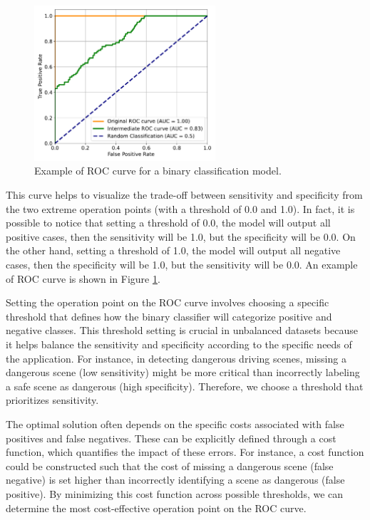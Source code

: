 \begin{figure}
    \centering
    \includegraphics[width=0.6\textwidth]{images/roc/roc_curve.pdf}
    \caption
    {Example of ROC curve for a binary classification model.}
    \label{fig:roc_curve}
\end{figure}
This curve helps to 
visualize the trade-off between sensitivity and specificity from the two extreme 
operation points (with a threshold of 0.0 and 1.0).
In fact, it is possible to notice that setting a threshold of 0.0, the model 
will output all positive cases, then the sensitivity will be 1.0, but the 
specificity will be 0.0. On the other hand, setting a threshold of 1.0, the model 
will output all negative cases, then the specificity will be 1.0, but the 
sensitivity will be 0.0. An example of ROC curve is shown in Figure 
\ref{fig:roc_curve}.

Setting the operation point on the ROC curve involves choosing a specific 
threshold that defines how the binary classifier will categorize positive and 
negative classes. This threshold setting is crucial in unbalanced datasets 
because it helps balance the sensitivity and specificity according to the 
specific needs of the application. For instance, in detecting dangerous driving 
scenes, missing a dangerous scene (low sensitivity) might be more critical than 
incorrectly labeling a safe scene as dangerous (high specificity). Therefore, 
we choose a threshold that prioritizes sensitivity.

The optimal solution often depends on the specific costs associated with false 
positives and false negatives. These can be explicitly defined through a cost 
function, which quantifies the impact of these errors. For instance, a cost 
function could be constructed such that the cost of missing a dangerous scene 
(false negative) is set higher than incorrectly identifying a scene as dangerous 
(false positive). By minimizing this cost function across possible thresholds, 
we can determine the most cost-effective operation point on the ROC curve.